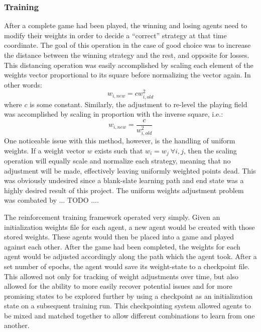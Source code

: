 
\subsubsection{Training}





After a complete game had been played, the winning and losing agents need to
modify their weights in order to decide a ``correct'' strategy at that time
coordinate.
%
The goal of this operation in the case of good choice was to increase the
distance between the winning strategy and the rest, and opposite for losses.
%
This distancing operation was easily accomplished by scaling each element of the
weights vector proportional to its square before normalizing the vector again.
%
In other words:
\[
w_{i,new} = c w_{i,old} ^2
\]
where $c$ is some constant.
%
Similarly, the adjustment to re-level the playing field was accomplished by
scaling in proportion with the inverse square, i.e.:
\[
w_{i,new} = \frac{c}{w_{i,old}^2}
\]
%
One noticeable issue with this method, however, is the handling of uniform
weights.
%
If a weight vector $w$ exists such that $w_i = w_j \ \forall i,j$,
then the scaling operation will equally scale and normalize each strategy,
meaning that no adjustment will be made,
effectively leaving uniformly weighted points dead.
%
This was obviously undesired since a blank-slate learning path and end state was
a highly desired result of this project.
%
The uniform weights adjustment problem was combated by ... TODO ....


The reinforcement training framework operated very simply.
%
Given an initialization weights file for each agent, a new agent would be
created with those stored weights.
%
These agents would then be placed into a game and played against each other.
%
After the game had been completed, the weights for each agent would be adjusted
accordingly along the path which the agent took.
%
After a set number of epochs, the agent would save its weight-state to a
checkpoint file.
%
This allowed not only for tracking of weight adjustments over time, but also
allowed for the ability to more easily recover potential issues and for more
promising states to be explored further by using a checkpoint as an
initialization state on a subsequent training run.
%
This checkpointing system allowed agents to be mixed and matched together to
allow different combinations to learn from one another.

